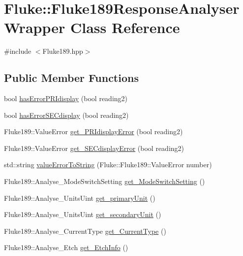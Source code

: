 \hypertarget{classFluke_1_1Fluke189ResponseAnalyserWrapper}{
\section{Fluke::Fluke189ResponseAnalyserWrapper Class Reference}
\label{classFluke_1_1Fluke189ResponseAnalyserWrapper}
}


{\ttfamily \#include $<$Fluke189.hpp$>$}\subsection*{Public Member Functions}
\begin{DoxyCompactItemize}
\item 
bool \hyperlink{classFluke_1_1Fluke189ResponseAnalyserWrapper_ac1f09299bd05dc25cb95cb7e113ac849}{hasErrorPRIdisplay} (bool reading2)
\item 
bool \hyperlink{classFluke_1_1Fluke189ResponseAnalyserWrapper_a6a90a44e2abfa2d425445e951004e7d9}{hasErrorSECdisplay} (bool reading2)
\item 
Fluke189::ValueError \hyperlink{classFluke_1_1Fluke189ResponseAnalyserWrapper_a8e83974e8215911b422c7d6bde35437e}{get\_\-PRIdisplayError} (bool reading2)
\item 
Fluke189::ValueError \hyperlink{classFluke_1_1Fluke189ResponseAnalyserWrapper_ada16572cd1846bdb7d5d863d08e370a5}{get\_\-SECdisplayError} (bool reading2)
\item 
std::string \hyperlink{classFluke_1_1Fluke189ResponseAnalyserWrapper_aaa5b49da3d9ef2a61bc9b2bf11f4edee}{valueErrorToString} (Fluke::Fluke189::ValueError number)
\item 
Fluke189::Analyse\_\-ModeSwitchSetting \hyperlink{classFluke_1_1Fluke189ResponseAnalyserWrapper_ab9c2c45e6a6b8b2d0b89c8c5bab0c110}{get\_\-ModeSwitchSetting} ()
\item 
Fluke189::Analyse\_\-UnitsUint \hyperlink{classFluke_1_1Fluke189ResponseAnalyserWrapper_a6bea7010b65b43abe8918fdfeccf3dca}{get\_\-primaryUnit} ()
\item 
Fluke189::Analyse\_\-UnitsUint \hyperlink{classFluke_1_1Fluke189ResponseAnalyserWrapper_ab70587acaf503ce077a8dd5a870ca4a6}{get\_\-secondaryUnit} ()
\item 
Fluke189::Analyse\_\-CurrentType \hyperlink{classFluke_1_1Fluke189ResponseAnalyserWrapper_a31b55c6b5400156efc8040a3f4b7437d}{get\_\-CurrentType} ()
\item 
Fluke189::Analyse\_\-Etch \hyperlink{classFluke_1_1Fluke189ResponseAnalyserWrapper_af78476c14cae1c2be2f3ee370e28efca}{get\_\-EtchInfo} ()
\end{DoxyCompactItemize}
